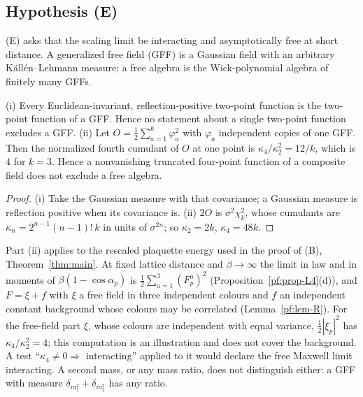 \subsection{Hypothesis (E)}

(E) asks that the scaling limit be interacting and asymptotically free at short distance. A
generalized free field (GFF) is a Gaussian field with an arbitrary K\"all\'en--Lehmann measure;
a free algebra is the Wick-polynomial algebra of finitely many GFFs.

\begin{proposition}\label{neg:prop-GFF}
\textup{(i)} Every Euclidean-invariant, reflection-positive two-point function is the two-point
function of a GFF. Hence no statement about a single two-point function excludes a GFF.
\textup{(ii)} Let $O=\frac12\sum_{a=1}^k\varphi_a^2$ with $\varphi_a$ independent copies of one
GFF. Then the normalized fourth cumulant of $O$ at one point is $\kappa_4/\kappa_2^2=12/k$, which
is $4$ for $k=3$. Hence a nonvanishing truncated four-point function of a composite field does
not exclude a free algebra.
\end{proposition}

\begin{proof}
(i) Take the Gaussian measure with that covariance; a Gaussian measure is reflection positive
when its covariance is. (ii) $2O$ is $\sigma^2\chi^2_k$, whose cumulants are
$\kappa_n=2^{n-1}(n-1)!\,k$ in units of $\sigma^{2n}$; so $\kappa_2=2k$, $\kappa_4=48k$.
\end{proof}

Part (ii) applies to the rescaled plaquette energy used in the proof of (B),
Theorem~\ref{thm:main}. At fixed lattice distance and
$\beta\to\infty$ the limit in law and in moments of $\beta(1-\cos\alpha_p)$ is
$\frac12\sum_{a=1}^3(F^a_p)^2$ (Proposition~\ref{pf:prop-L4}(d)), and $F=\xi+f$ with $\xi$ a free
field in three independent colours and $f$ an independent constant background whose colours may be
correlated (Lemma~\ref{pf:lem-R}). For the free-field part $\xi$, whose colours are independent
with equal variance, $\frac12|\xi_p|^2$ has $\kappa_4/\kappa_2^2=4$; this computation is an
illustration and does not cover the background. A test ``$\kappa_4\ne0\Rightarrow$ interacting'' applied to it would
declare the free Maxwell limit interacting. A second mass, or any mass ratio, does not
distinguish either: a GFF with measure $\delta_{m_1^2}+\delta_{m_2^2}$ has any ratio.

